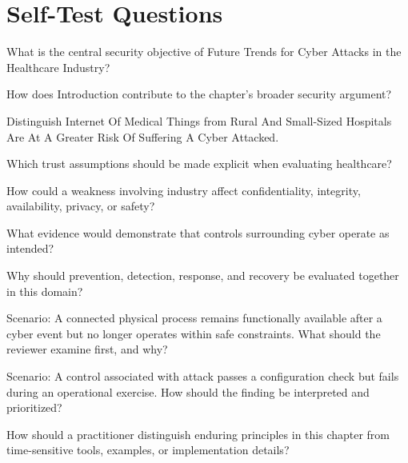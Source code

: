 \documentclass[11pt,letterpaper]{article}
\begin{document}
\section*{Self-Test Questions}
\begin{CornellRecallList}
\item What is the central security objective of Future Trends for Cyber Attacks in the Healthcare Industry?
\item How does Introduction contribute to the chapter's broader security argument?
\item Distinguish Internet Of Medical Things from Rural And Small-Sized Hospitals Are At A Greater Risk Of Suffering A Cyber Attacked.
\item Which trust assumptions should be made explicit when evaluating healthcare?
\item How could a weakness involving industry affect confidentiality, integrity, availability, privacy, or safety?
\item What evidence would demonstrate that controls surrounding cyber operate as intended?
\item Why should prevention, detection, response, and recovery be evaluated together in this domain?
\item Scenario: A connected physical process remains functionally available after a cyber event but no longer operates within safe constraints. What should the reviewer examine first, and why?
\item Scenario: A control associated with attack passes a configuration check but fails during an operational exercise. How should the finding be interpreted and prioritized?
\item How should a practitioner distinguish enduring principles in this chapter from time-sensitive tools, examples, or implementation details?
\end{CornellRecallList}
\end{document}

